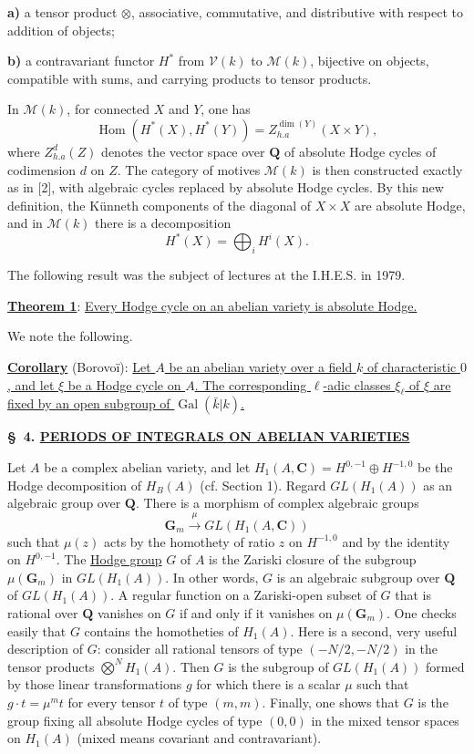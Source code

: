 \documentclass[10pt,a4paper]{article}
\newcommand{\Q}{\mathbf Q}
\newcommand{\C}{\mathbf C}
\newcommand{\Gm}{\mathbf G_m}
\begin{document}
\textbf{a)} a tensor product $\otimes$, associative, commutative, and distributive with respect to addition of objects;

\textbf{b)} a contravariant functor $H^*$ from $\mathcal V(k)$ to $\mathcal M(k)$, bijective on objects, compatible with sums, and carrying products to tensor products.

In $\mathcal M(k)$, for connected $X$ and $Y$, one has
\[
\operatorname{Hom}(H^*(X),H^*(Y))=Z_{h.a}^{\dim(Y)}(X\times Y),
\]
where $Z_{h.a}^d(Z)$ denotes the vector space over $\Q$ of absolute Hodge cycles of codimension $d$ on $Z$. The category of motives $\mathcal M(k)$ is then constructed exactly as in [2], with algebraic cycles replaced by absolute Hodge cycles. By this new definition, the Künneth components of the diagonal of $X\times X$ are absolute Hodge, and in $\mathcal M(k)$ there is a decomposition
\[
H^*(X)=\bigoplus_i H^i(X).
\]


\newpage


The following result was the subject of lectures at the I.H.E.S. in 1979.

\vspace{0.5em}
\noindent\uline{\textbf{Theorem 1}}: \uline{Every Hodge cycle on an abelian variety is absolute Hodge.}

We note the following.

\noindent\uline{\textbf{Corollary}} (Borovoï): \uline{Let $A$ be an abelian variety over a field $k$ of characteristic $0$, and let $\xi$ be a Hodge cycle on $A$. The corresponding $\ell$-adic classes $\xi_\ell$ of $\xi$ are fixed by an open subgroup of $\operatorname{Gal}(\bar k|k)$.}

\vspace{1em}
\noindent\textbf{\S\ 4. \quad \uline{PERIODS OF INTEGRALS ON ABELIAN VARIETIES}}

Let $A$ be a complex abelian variety, and let $H_1(A,\C)=H^{0,-1}\oplus H^{-1,0}$ be the Hodge decomposition of $H_B(A)$ (cf. Section 1). Regard $GL(H_1(A))$ as an algebraic group over $\Q$. There is a morphism of complex algebraic groups
\[
\Gm\xrightarrow{\mu}GL(H_1(A,\C))
\]
such that $\mu(z)$ acts by the homothety of ratio $z$ on $H^{-1,0}$ and by the identity on $H^{0,-1}$. The \uline{Hodge group} $G$ of $A$ is the Zariski closure of the subgroup $\mu(\Gm)$ in $GL(H_1(A))$. In other words, $G$ is an algebraic subgroup over $\Q$ of $GL(H_1(A))$. A regular function on a Zariski-open subset of $G$ that is rational over $\Q$ vanishes on $G$ if and only if it vanishes on $\mu(\Gm)$. One checks easily that $G$ contains the homotheties of $H_1(A)$. Here is a second, very useful description of $G$: consider all rational tensors of type $(-N/2,-N/2)$ in the tensor products $\bigotimes^N H_1(A)$. Then $G$ is the subgroup of $GL(H_1(A))$ formed by those linear transformations $g$ for which there is a scalar $\mu$ such that $g\cdot t=\mu^m t$ for every tensor $t$ of type $(m,m)$. Finally, one shows that $G$ is the group fixing all absolute Hodge cycles of type $(0,0)$ in the mixed tensor spaces on $H_1(A)$ (mixed means covariant and contravariant).
\end{document}
